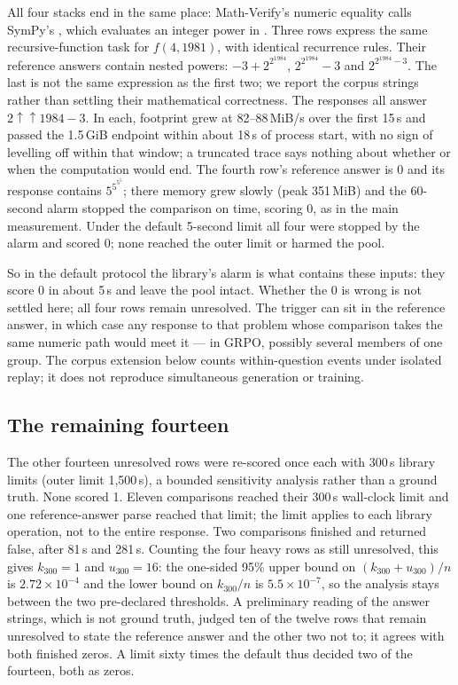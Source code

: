 \documentclass[11pt,a4paper]{article}
\begin{document}
All four stacks end in the same place: Math-Verify's numeric equality calls SymPy's , which evaluates an integer power in . Three rows express the same recursive-function task for $f(4,1981)$, with identical recurrence rules. Their reference answers contain nested powers: $-3+2^{2^{1984}}$, $2^{2^{1984}}-3$ and $2^{2^{1984}-3}$. The last is not the same expression as the first two; we report the corpus strings rather than settling their mathematical correctness. The responses all answer $2\uparrow\uparrow1984-3$. In each, footprint grew at 82--88\,MiB/s over the first 15\,s and passed the 1.5\,GiB endpoint within about 18\,s of process start, with no sign of levelling off within that window; a truncated trace says nothing about whether or when the computation would end. The fourth row's reference answer is 0 and its response contains $5^{5^{5^5}}$; there memory grew slowly (peak 351\,MiB) and the 60-second alarm stopped the comparison on time, scoring 0, as in the main measurement. Under the default 5-second limit all four were stopped by the alarm and scored 0; none reached the outer limit or harmed the pool.

So in the default protocol the library's alarm is what contains these inputs: they score 0 in about 5\,s and leave the pool intact. Whether the 0 is wrong is not settled here; all four rows remain unresolved. The trigger can sit in the reference answer, in which case any response to that problem whose comparison takes the same numeric path would meet it --- in GRPO, possibly several members of one group. The corpus extension below counts within-question events under isolated replay; it does not reproduce simultaneous generation or training.

\subsection{The remaining fourteen}
The other fourteen unresolved rows were re-scored once each with 300\,s library limits (outer limit 1,500\,s), a bounded sensitivity analysis rather than a ground truth. None scored 1. Eleven comparisons reached their 300\,s wall-clock limit and one reference-answer parse reached that limit; the limit applies to each library operation, not to the entire response. Two comparisons finished and returned false, after 81\,s and 281\,s. Counting the four heavy rows as still unresolved, this gives $k_{300}=1$ and $u_{300}=16$: the one-sided 95\% upper bound on $(k_{300}+u_{300})/n$ is $2.72\times10^{-4}$ and the lower bound on $k_{300}/n$ is $5.5\times10^{-7}$, so the analysis stays between the two pre-declared thresholds. A preliminary reading of the answer strings, which is not ground truth, judged ten of the twelve rows that remain unresolved to state the reference answer and the other two not to; it agrees with both finished zeros. A limit sixty times the default thus decided two of the fourteen, both as zeros.
\end{document}
